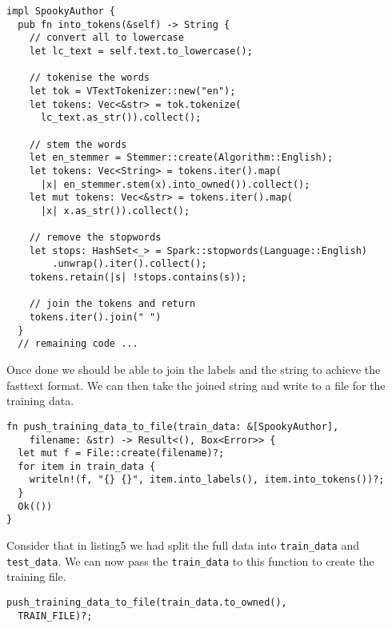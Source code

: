 \documentclass{book}
\begin{document}
\begin{lstlisting}[caption={chapter5\\/fasttext\\-model\\/src\\/main\\.rs}, basicstyle=\small]
impl SpookyAuthor {
  pub fn into_tokens(&self) -> String {
    // convert all to lowercase
    let lc_text = self.text.to_lowercase();

    // tokenise the words
    let tok = VTextTokenizer::new("en");
    let tokens: Vec<&str> = tok.tokenize(
      lc_text.as_str()).collect();

    // stem the words
    let en_stemmer = Stemmer::create(Algorithm::English);
    let tokens: Vec<String> = tokens.iter().map(
      |x| en_stemmer.stem(x).into_owned()).collect();
    let mut tokens: Vec<&str> = tokens.iter().map(
      |x| x.as_str()).collect();

    // remove the stopwords
    let stops: HashSet<_> = Spark::stopwords(Language::English)
        .unwrap().iter().collect();
    tokens.retain(|s| !stops.contains(s));

    // join the tokens and return
    tokens.iter().join(" ")
  }
  // remaining code ...
\end{lstlisting}

Once done we should be able to join the labels and the string to achieve the fasttext format. We can then take the joined string and write to a file for the training data.

\begin{lstlisting}[caption={chapter5\\/fasttext\\-model\\/src\\/main\\.rs}, basicstyle=\small]
fn push_training_data_to_file(train_data: &[SpookyAuthor],
    filename: &str) -> Result<(), Box<Error>> {
  let mut f = File::create(filename)?;
  for item in train_data {
    writeln!(f, "{} {}", item.into_labels(), item.into_tokens())?;
  }
  Ok(())
}
\end{lstlisting}

Consider that in listing5 we had split the full data into \lstinline{train_data} and \lstinline{test_data}. We can now pass the \lstinline{train_data} to this function to create the training file.

\begin{lstlisting}[caption={chapter5\\/fasttext\\-model\\/src\\/main\\.rs}, basicstyle=\small]
push_training_data_to_file(train_data.to_owned(),
  TRAIN_FILE)?;
\end{lstlisting}
\end{document}
